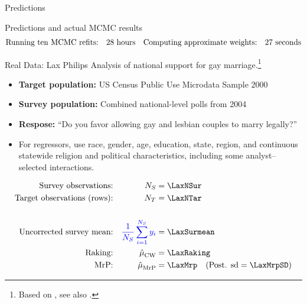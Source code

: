 \begin{frame}[t]{Predictions}
    \AlexanderPredictionFigOne{}
\end{frame}


\begin{frame}[t]{Predictions and actual MCMC results}
    \AlexanderPredictionFigTwo{}
    \vspace{-3em}
    $$
    \begin{aligned}
        \textrm{Running ten MCMC refits:}\quad & 28 \textrm{ hours} &
        \textrm{Computing approximate weights:}\quad &27 \textrm{ seconds}\\
    \end{aligned}
    $$
\end{frame}




\begin{frame}{Real Data: Lax Philips}
Analysis of national support for gay marriage.\footnote{Based on \textcite{kastellec:2010:laxmrp},
see also \textcite{lax:2009:gay}.}

\begin{itemize}
    \item \textbf{Target population:} US Census Public Use Microdata Sample 2000
    \item \textbf{Survey population:} Combined national-level polls from 2004
    \item \textbf{Respose:}  ``Do you favor allowing gay and lesbian couples to marry legally?''
    \item For regressors, use race, gender, age, education, state, region,
        and continuous statewide religion and political characteristics, including
        some analyst--selected interactions.
\end{itemize}

$$
\begin{aligned}
    \textrm{Survey observations:} &&  \Nsur ={}& \LaxNSur  \\
    \textrm{Target observations (rows):} &&  \Ntar ={}& \LaxNTar \\
    \\
    \textrm{Uncorrected survey mean:} && \surcol{\meansur \y_i} ={}& \LaxSurmean \\
    \textrm{Raking:} && \muhat_\cal ={}& \LaxRaking \\
    \textrm{MrP:} && \muhat_\mrp ={}& \LaxMrp
        \quad(\textrm{Post. sd} = \LaxMrpSD)\\
\end{aligned}
$$
%
\end{frame}